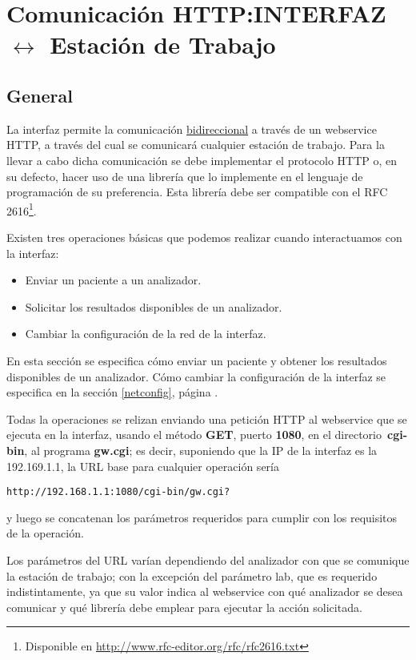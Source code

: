 \documentclass[titlepage,12pt]{article}
\begin{document}
\section{Comunicación HTTP:\newline INTERFAZ $\longleftrightarrow$ Estación de Trabajo}\label{http}

\subsection{General}\label{http.general}

La interfaz permite la comunicación \underline{bidireccional} a través
de un webservice HTTP, a través
del cual se comunicará cualquier estación de trabajo. Para la llevar a
cabo dicha comunicación se debe implementar el protocolo HTTP o, en su
defecto, hacer uso de una librería que lo implemente en el lenguaje de
programación de su preferencia. Esta librería debe ser compatible con
el RFC 2616\footnote{Disponible en \url{http://www.rfc-editor.org/rfc/rfc2616.txt}}.

Existen tres operaciones básicas que podemos realizar cuando
interactuamos con la interfaz:
\begin{itemize}
\item Enviar un paciente a un analizador.
\item Solicitar los resultados disponibles de un analizador.
\item Cambiar la configuración de la red de la interfaz.
\end{itemize}

En esta sección se especifica cómo enviar un paciente y obtener los
resultados disponibles de un analizador. Cómo cambiar la configuración
de la interfaz se especifica en la sección \ref{netconfig}, página
\pageref{netconfig}.



Todas la operaciones se relizan enviando una petición HTTP al
webservice que se ejecuta en la interfaz, usando el método \textbf{GET}, puerto
\textbf{1080}, en el directorio~\textbf{cgi-bin}, al programa
\textbf{gw.cgi}; es decir, suponiendo que la IP de la interfaz es la
192.169.1.1, la URL base para cualquier operación sería

\texttt{http://192.168.1.1:1080/cgi-bin/gw.cgi?}

\noindent y luego se concatenan los parámetros requeridos para cumplir
con los requisitos de la operación.

Los parámetros del URL varían dependiendo del analizador con que se
comunique la estación de trabajo; con la excepción del parámetro
\textsf{lab}, que es requerido indistintamente, ya que su valor indica
al webservice con qué analizador se desea comunicar y qué librería
debe emplear para ejecutar la acción solicitada.
\end{document}
